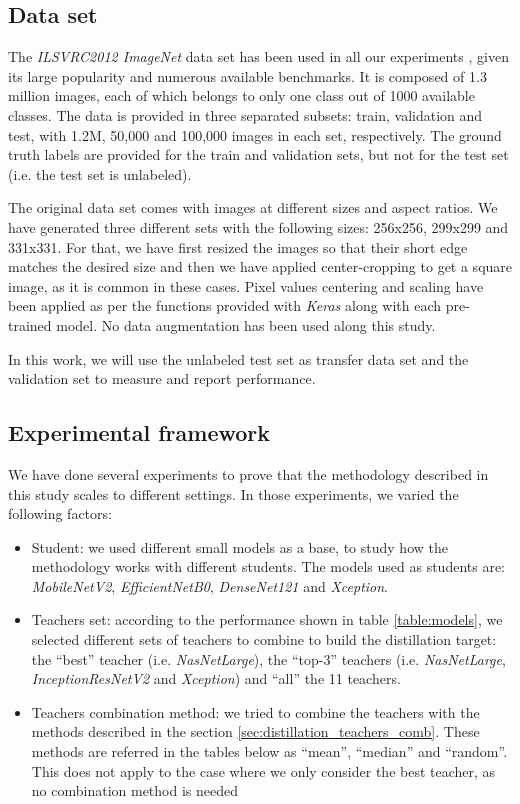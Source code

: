 \subsection{Data set}
The \textit{ILSVRC2012 ImageNet} data set has been used in all our experiments \autocite{ILSVRC15}, given its large popularity and numerous available benchmarks. It is composed of 1.3 million images,  each of which belongs to only one class out of 1000 available classes. The data is provided in three separated subsets: train, validation and test, with 1.2M, 50,000 and 100,000 images in each set, respectively. The ground truth labels are provided for the train and validation sets, but not for the test set (i.e. the test set is unlabeled).

The original data set comes with images at different sizes and aspect ratios. We have generated three different sets with the following sizes: 256x256, 299x299 and 331x331. For that, we have first resized the images so that their short edge matches the desired size and then we have applied center-cropping to get a square image, as it is common in these cases. Pixel values centering and scaling have been applied as per the functions provided with \textit{Keras} along with each pre-trained model. No data augmentation has been used along this study.

In this work, we will use the unlabeled test set as transfer data set and the validation set to measure and report performance.

\subsection{Experimental framework}
We have done several experiments to prove that the methodology described in this study scales to different settings. In those experiments, we varied the following factors:

\begin{itemize}
	\item Student: we used different small models as a base, to study how the methodology works with different students. The models used as students are: \textit{MobileNetV2}, \textit{EfficientNetB0}, \textit{DenseNet121} and \textit{Xception}.
	\item Teachers set: according to the performance shown in table \ref{table:models}, we selected different sets of teachers to combine to build the distillation target: the ``best'' teacher (i.e. \textit{NasNetLarge}), the ``top-3'' teachers (i.e. \textit{NasNetLarge}, \textit{InceptionResNetV2} and \textit{Xception}) and ``all'' the 11 teachers.
	\item Teachers combination method: we tried to combine the teachers with the methods described in the section \ref{sec:distillation_teachers_comb}. These methods are referred in the tables below as ``mean'', ``median'' and ``random''. This does not apply to the case where we only consider the best teacher, as no combination method is needed
\end{itemize}

